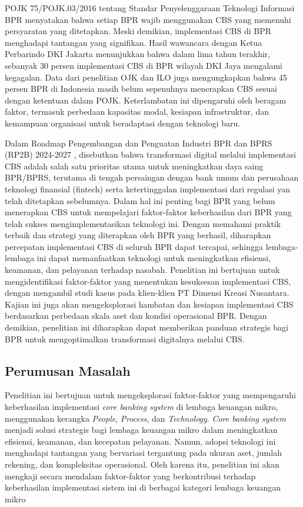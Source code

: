 \documentclass[journal,article,submit,pdftex,moreauthors]{Definitions/mdpi}
\begin{document}
POJK 75/POJK.03/2016 tentang Standar Penyelenggaraan Teknologi Informasi BPR menyatakan bahwa setiap BPR wajib menggunakan CBS yang memenuhi persyaratan yang ditetapkan. Meski demikian, implementasi CBS di BPR menghadapi tantangan yang signifikan. Hasil wawancara dengan Ketua Perbarindo DKI Jakarta menunjukkan bahwa dalam lima tahun terakhir, sebanyak 30 persen implementasi CBS di BPR wilayah DKI Jaya mengalami kegagalan. Data dari penelitian OJK dan ILO  \cite{Sitorus2023digital} juga mengungkapkan bahwa 45 persen BPR di Indonesia masih belum sepenuhnya menerapkan CBS sesuai dengan ketentuan dalam POJK. Keterlambatan ini dipengaruhi oleh beragam faktor, termasuk perbedaan kapasitas modal, kesiapan infrastruktur, dan kemampuan organisasi untuk beradaptasi dengan teknologi baru.

Dalam Roadmap Pengembangan dan Penguatan Industri BPR dan BPRS (RP2B) 2024-2027 \cite{OJK2024roadmap}, disebutkan bahwa transformasi digital melalui implementasi CBS adalah salah satu prioritas utama untuk meningkatkan daya saing BPR/BPRS, terutama di tengah persaingan dengan bank umum dan perusahaan teknologi finansial (fintech) serta ketertinggalan implementasi dari regulasi yan telah ditetapkan sebelumnya. Dalam hal ini penting bagi BPR yang belum menerapkan CBS untuk mempelajari faktor-faktor keberhasilan dari BPR yang telah sukses mengimplementasikan teknologi ini. Dengan memahami praktik terbaik dan strategi yang diterapkan oleh BPR yang berhasil, diharapkan percepatan implementasi CBS di seluruh BPR dapat tercapai, sehingga lembaga-lembaga ini dapat memanfaatkan teknologi untuk meningkatkan efisiensi, keamanan, dan pelayanan terhadap nasabah. Penelitian ini bertujuan untuk mengidentifikasi faktor-faktor yang menentukan kesuksesan implementasi CBS, dengan mengambil studi kasus pada klien-klien PT Dimensi Kreasi Nusantara. Kajian ini juga akan mengeksplorasi hambatan dan kesiapan implementasi CBS berdasarkan perbedaan skala aset dan kondisi operasional BPR. Dengan demikian, penelitian ini diharapkan dapat memberikan panduan strategis bagi BPR untuk mengoptimalkan transformasi digitalnya melalui CBS.

\subsection{Perumusan Masalah}

Penelitian ini bertujuan untuk mengeksplorasi faktor-faktor yang mempengaruhi keberhasilan implementasi \textit{core banking system} di lembaga keuangan mikro, menggunakan kerangka \textit{People}, \textit{Process}, dan \textit{Technology}. \textit{Core banking system} menjadi solusi strategis bagi lembaga keuangan mikro dalam meningkatkan efisiensi, keamanan, dan kecepatan pelayanan. Namun, adopsi teknologi ini menghadapi tantangan yang bervariasi tergantung pada ukuran aset, jumlah rekening, dan kompleksitas operasional. Oleh karena itu, penelitian ini akan mengkaji secara mendalam faktor-faktor yang berkontribusi terhadap keberhasilan implementasi sistem ini di berbagai kategori lembaga keuangan mikro
\end{document}
